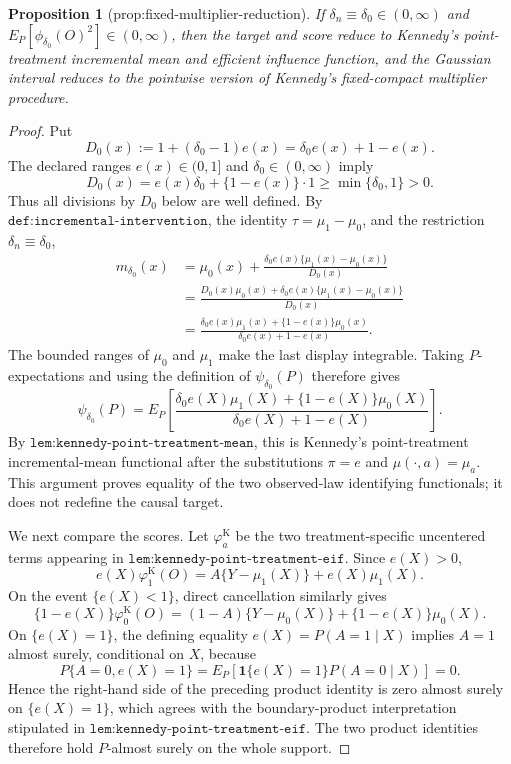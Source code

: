 \documentclass{article}
\newtheorem{proposition}{Proposition}
\begin{document}
\begin{proposition}[prop:fixed-multiplier-reduction]\label{prop:fixed-multiplier-reduction}
If \(\delta_n\equiv\delta_0\in(0,\infty)\) and \(E_P[\phi_{\delta_0}(O)^2]\in(0,\infty)\), then the target and score reduce to Kennedy's point-treatment incremental mean and efficient influence function, and the Gaussian interval reduces to the pointwise version of Kennedy's fixed-compact multiplier procedure.
\end{proposition}
\begin{proof}
Put
\[
D_0(x):=1+(\delta_0-1)e(x)=\delta_0e(x)+1-e(x).
\]
The declared ranges \(e(x)\in(0,1]\) and \(\delta_0\in(0,\infty)\) imply
\[
D_0(x)=e(x)\delta_0+\{1-e(x)\}\cdot 1
\geq \min\{\delta_0,1\}>0.
\]
Thus all divisions by \(D_0\) below are well defined.  By
\(\texttt{def:incremental-intervention}\), the identity
\(\tau=\mu_1-\mu_0\), and the restriction \(\delta_n\equiv\delta_0\),
\[
\begin{aligned}
m_{\delta_0}(x)
&=\mu_0(x)+
  \frac{\delta_0e(x)\{\mu_1(x)-\mu_0(x)\}}{D_0(x)}\\
&=\frac{D_0(x)\mu_0(x)
  +\delta_0e(x)\{\mu_1(x)-\mu_0(x)\}}{D_0(x)}\\
&=\frac{\delta_0e(x)\mu_1(x)+\{1-e(x)\}\mu_0(x)}
        {\delta_0e(x)+1-e(x)}.
\end{aligned}
\]
The bounded ranges of \(\mu_0\) and \(\mu_1\) make the last display
integrable.  Taking \(P\)-expectations and using the definition of
\(\psi_{\delta_0}(P)\) therefore gives
\[
\psi_{\delta_0}(P)
=E_P\!\left[
\frac{\delta_0e(X)\mu_1(X)+\{1-e(X)\}\mu_0(X)}
     {\delta_0e(X)+1-e(X)}
\right].
\]
By \(\texttt{lem:kennedy-point-treatment-mean}\), this is Kennedy's
point-treatment incremental-mean functional after the substitutions
\(\pi=e\) and \(\mu(\cdot,a)=\mu_a\).  This argument proves equality of
the two observed-law identifying functionals; it does not redefine the
causal target.

We next compare the scores.  Let \(\varphi_a^{\mathrm K}\) be the two
treatment-specific uncentered terms appearing in
\(\texttt{lem:kennedy-point-treatment-eif}\).  Since \(e(X)>0\),
\[
e(X)\varphi_1^{\mathrm K}(O)
=A\{Y-\mu_1(X)\}+e(X)\mu_1(X).
\]
On the event \(\{e(X)<1\}\), direct cancellation similarly gives
\[
\{1-e(X)\}\varphi_0^{\mathrm K}(O)
=(1-A)\{Y-\mu_0(X)\}+\{1-e(X)\}\mu_0(X).
\]
On \(\{e(X)=1\}\), the defining equality
\(e(X)=P(A=1\mid X)\) implies \(A=1\) almost surely, conditional on
\(X\), because
\[
P\{A=0,e(X)=1\}
=E_P\!\left[\mathbf 1\{e(X)=1\}P(A=0\mid X)\right]=0.
\]
Hence the right-hand side of the preceding product identity is zero
almost surely on \(\{e(X)=1\}\), which agrees with the boundary-product
interpretation stipulated in
\(\texttt{lem:kennedy-point-treatment-eif}\).  The two product identities
therefore hold \(P\)-almost surely on the whole support.


\end{proof}
\end{document}
